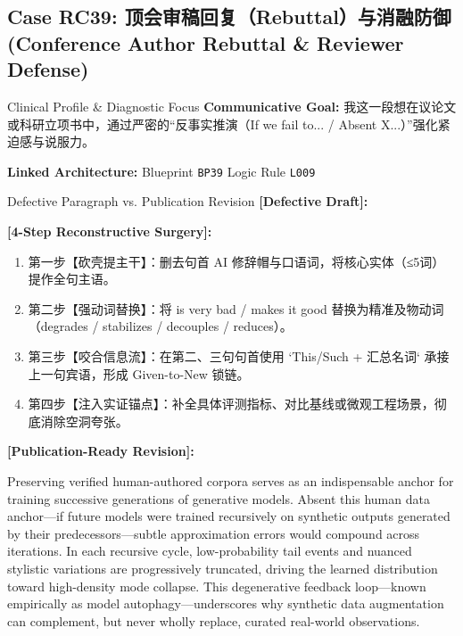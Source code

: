 \subsection{Case RC39: 顶会审稿回复（Rebuttal）与消融防御 (Conference Author Rebuttal \& Reviewer Defense)}\label{case:RC39}
\begin{ConceptBox}{Clinical Profile \& Diagnostic Focus}
\textbf{Communicative Goal:} 我这一段想在议论文或科研立项书中，通过严密的“反事实推演（If we fail to... / Absent X...）”强化紧迫感与说服力。\par
\textbf{Linked Architecture:} Blueprint \texttt{BP39} \enspace\textbar\enspace Logic Rule \texttt{L009}
\end{ConceptBox}
\begin{ExampleBox}{Defective Paragraph vs. Publication Revision}
\textbf{\color{TargetHighlight}[Defective Draft]:}\par
{}\par\vspace{6pt}
\textbf{\color{AcadForest}[4-Step Reconstructive Surgery]:}
\begin{enumerate}[label=\textbf{\color{AcadNavy}Step \arabic*:}, leftmargin=2em]
  \item 第一步【砍壳提主干】：删去句首 AI 修辞帽与口语词，将核心实体（≤5词）提作全句主语。
  \item 第二步【强动词替换】：将 is very bad / makes it good 替换为精准及物动词（degrades / stabilizes / decouples / reduces）。
  \item 第三步【咬合信息流】：在第二、三句句首使用 `This/Such + 汇总名词` 承接上一句宾语，形成 Given-to-New 锁链。
  \item 第四步【注入实证锚点】：补全具体评测指标、对比基线或微观工程场景，彻底消除空洞夸张。
\end{enumerate}\vspace{4pt}
\textbf{\color{AcadNavy}[Publication-Ready Revision]:}\par
Preserving verified human-authored corpora serves as an indispensable anchor for training successive generations of generative models. Absent this human data anchor---if future models were trained recursively on synthetic outputs generated by their predecessors---subtle approximation errors would compound across iterations. In each recursive cycle, low-probability tail events and nuanced stylistic variations are progressively truncated, driving the learned distribution toward high-density mode collapse. This degenerative feedback loop---known empirically as model autophagy---underscores why synthetic data augmentation can complement, but never wholly replace, curated real-world observations.
\end{ExampleBox}

